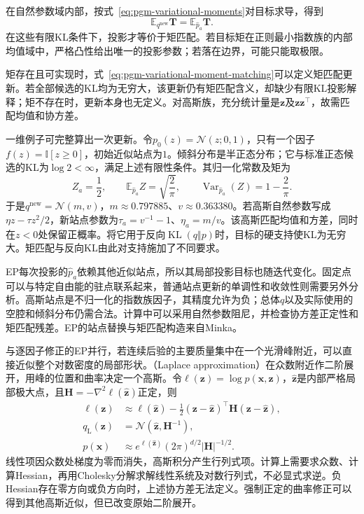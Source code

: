 在自然参数域内部，按式~\eqref{eq:pgm-variational-moments}对目标求导，得到
\begin{equation}
  \mathbb E_{q^{\mathrm{new}}}\bm T
     =\mathbb E_{\widehat p_a}\bm T.
  \label{eq:pgm-variational-moment-matching}
\end{equation}
在这些有限KL条件下，投影才等价于矩匹配。若目标矩在正则最小指数族的内部均值域中，严格凸性给出唯一的投影参数；若落在边界，可能只能取极限。

矩存在且可实现时，式~\eqref{eq:pgm-variational-moment-matching}可以定义矩匹配更新。若全部候选的KL均为无穷大，该更新仍有矩匹配含义，却缺少有限KL投影解释；矩不存在时，更新本身也无定义。对高斯族，充分统计量是$\bm z$及$\bm z\bm z^\top$，故需匹配均值和协方差。

一维例子可完整算出一次更新。令$p_0(z)=\mathcal N(z;0,1)$，只有一个因子$f(z)=\mathbb I[z\geq0]$，初始近似站点为$1$。倾斜分布是半正态分布；它与标准正态候选的KL为$\log2<\infty$，满足上述有限性条件。其归一化常数及矩为
\[
  Z_a=\frac12,\qquad
  \mathbb E_{\widehat p_a}Z=\sqrt{\frac2\pi},\qquad
  \operatorname{Var}_{\widehat p_a}(Z)=1-\frac2\pi.
\]
于是$q^{\mathrm{new}}=\mathcal N(m,v)$，$m\approx0.797885$、$v\approx0.363380$。若高斯自然参数写成$\eta z-\tau z^2/2$，新站点参数为$\tau_a=v^{-1}-1$、$\eta_a=m/v$。该高斯匹配均值和方差，同时在$z<0$处保留正概率。将它用于反向$\operatorname{KL}(q\Vert p)$时，目标的硬支持使KL为无穷大。矩匹配与反向KL由此对支持施加了不同要求。

EP每次投影的$\widehat p_a$依赖其他近似站点，所以其局部投影目标也随迭代变化。固定点可以与特定自由能的驻点联系起来，普通站点更新的单调性和收敛性则需要另外分析。高斯站点是不归一化的指数族因子，其精度允许为负；总体$q$以及实际使用的空腔和倾斜分布仍需合法。计算中可以采用自然参数阻尼，并检查协方差正定性和矩匹配残差。EP的站点替换与矩匹配构造来自Minka。

\label{sec:pgm-variational-laplace}

与逐因子修正的EP并行，若连续后验的主要质量集中在一个光滑峰附近，可以直接近似整个对数密度的局部形状。（Laplace approximation）在众数附近作二阶展开，用峰的位置和曲率决定一个高斯。令$\ell(\bm z)=\log p(\bm x,\bm z)$，$\widehat{\bm z}$是内部严格局部极大点，且$\bm H=-\nabla^2\ell(\widehat{\bm z})$正定，则
\begin{equation}
  \begin{aligned}
    \ell(\bm z)&\approx\ell(\widehat{\bm z})
       -\frac12(\bm z-\widehat{\bm z})^\top
                  \bm H(\bm z-\widehat{\bm z}),\\
    q_{\mathrm L}(\bm z)&=\mathcal N(\widehat{\bm z},\bm H^{-1}),\\
    p(\bm x)&\approx
       e^{\ell(\widehat{\bm z})}(2\pi)^{d/2}|\bm H|^{-1/2}.
  \end{aligned}
  \label{eq:pgm-variational-laplace}
\end{equation}
线性项因众数处梯度为零而消失，高斯积分产生行列式项。计算上需要求众数、计算Hessian，再用Cholesky分解求解线性系统及对数行列式，不必显式求逆。负Hessian存在零方向或负方向时，上述协方差无法定义。强制正定的曲率修正可以得到其他高斯近似，但已改变原始二阶展开。

